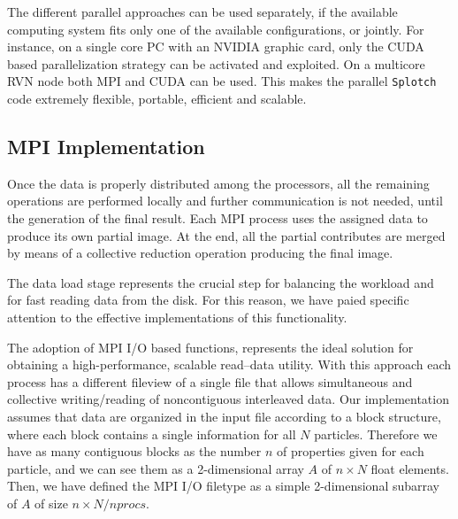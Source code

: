 The different parallel approaches can be used separately, 
if the available computing system fits only one of the available configurations, or jointly. 
For instance, on a single core PC with an NVIDIA graphic card, only the CUDA based 
parallelization strategy can be activated and exploited. On a multicore RVN \cite{rvn} 
node both MPI and CUDA can be used. This makes the parallel {\tt Splotch} code 
extremely flexible, portable, efficient and scalable.

\subsection{MPI Implementation}
\label{mpi}

Once the data is properly distributed among the processors, all the remaining operations 
are performed locally and further communication is not needed, until the generation
of the final result. Each MPI process uses the assigned 
data to produce its own partial image. At the end, all the partial contributes are merged by means of a 
collective reduction operation producing the final image. 

The data load stage represents the crucial step for balancing the workload and for fast reading 
data from the disk. 
For this reason,
we have paied specific attention to the effective implementations of this functionality.

The adoption of MPI I/O based functions, represents the ideal solution for obtaining 
a high-performance, scalable read--data utility. 
With this approach each process has a different fileview of a single file 
that allows simultaneous and collective
writing/reading of noncontiguous interleaved data. 
Our implementation assumes that data are organized in the input file according to a block structure, 
where each block contains a single information for 
all $N$ particles. Therefore we have as many contiguous blocks
as the number $n$ of properties given for each particle, and we can see them as a 2-dimensional array $A$ 
of $n \times N$ float elements. 
Then, we have defined the MPI I/O filetype as a simple 2-dimensional subarray of $A$ 
of size $n \times N/nprocs$.

